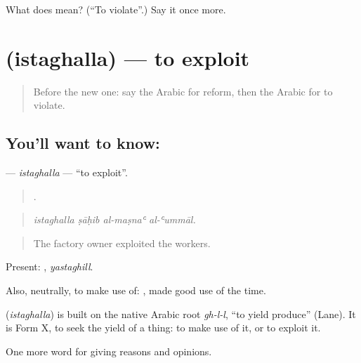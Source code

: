 \begin{tcolorbox}[breakable,colback=teal!4,colframe=teal!35!black,title={Before you move on}]
What does  mean? (\textquotedblleft{}To violate\textquotedblright{}.) Say it once more.
\end{tcolorbox}
\section[\texorpdfstring{\ar{استغل} (istaghalla)}{استغل (istaghalla)}]{ (istaghalla) — to exploit}

\label{lesson:AR-C388-istaghalla}



\begin{quote}
Before the new one: say the Arabic for reform, then the Arabic for to violate.
\end{quote}

\subsection*{You'll want to know: }
\textbf{} — \emph{istaghalla} — \textquotedblleft{}to exploit\textquotedblright{}.

\begin{quote}
   .
\end{quote}

\begin{quote}
\emph{istaghalla ṣāḥib al-maṣnaʿ al-ʿummāl.}
\end{quote}

\begin{quote}
The factory owner exploited the workers.
\end{quote}

Present: , \emph{yastaghill}.

Also, neutrally, to make use of:  , made good use of the time.

\begin{cousinweb}
\textbf{} (\emph{istaghalla}) is built on the native Arabic root \emph{gh-l-l}, \textquotedblleft{}to yield produce\textquotedblright{} (Lane). It is Form X, to seek the yield of a thing: to make use of it, or to exploit it.
\end{cousinweb}

\begin{grammarlens}[title={What you've built}]
One more word for giving reasons and opinions.
\end{grammarlens}

